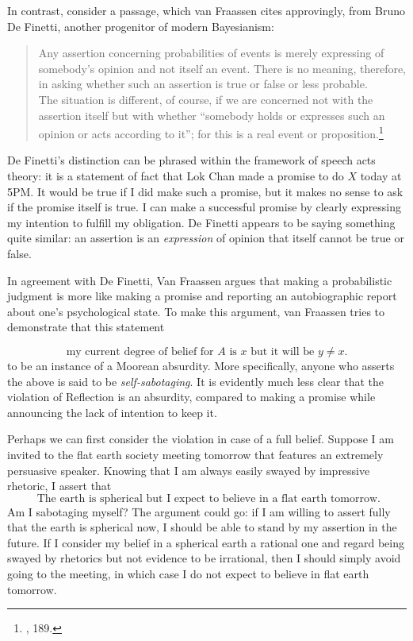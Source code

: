 In contrast, consider a passage, which van Fraassen cites approvingly,
from Bruno De Finetti, another progenitor of modern Bayesianism:

\begin{quote}
Any assertion concerning probabilities of events is merely expressing of
somebody's opinion and not itself an event. There is no meaning,
therefore, in asking whether such an assertion is true or false or less
probable.\\
The situation is different, of course, if we are concerned not with the
assertion itself but with whether ``somebody holds or expresses such an
opinion or acts according to it''; for this is a real event or
proposition.\footnote{\cite{definepis}, 189.}
\end{quote}

De Finetti's distinction can be phrased within the framework of speech
acts theory: it is a statement of fact that Lok Chan made a promise to
do \(X\) today at 5PM. It would be true if I did make such a promise,
but it makes no sense to ask if the promise itself is true. I can make a
successful promise by clearly expressing my intention to fulfill my
obligation. De Finetti appears to be saying something quite similar: an
assertion is an \emph{expression} of opinion that itself cannot be true
or false.

In agreement with De Finetti, Van Fraassen argues that making a
probabilistic judgment is more like making a promise and reporting an
autobiographic report about one's psychological state. To make this
argument, van Fraassen tries to demonstrate that this statement

\begin{equation}
		\text{my current degree of belief for \(A\) is \(x\) but it will be $y\neq x$.}
	\label{eq:reflviolation}
\end{equation}
to be an instance of a Moorean absurdity. More specifically, anyone who
asserts the above is said to be \emph{self-sabotaging}. It is evidently
much less clear that the violation of Reflection is an absurdity,
compared to making a promise while announcing the lack of intention to
keep it. 

Perhaps we can first consider the violation in case
of a full belief. Suppose I am invited to the flat earth society meeting
tomorrow that features an extremely persuasive speaker. Knowing that I am always easily swayed by impressive rhetoric, I assert that
\begin{equation}
	\text{ The earth is spherical but I expect to believe in a flat earth
  tomorrow.}
  \label{eq:flatearth}
\end{equation}
Am I sabotaging myself? The argument could go:  if I am willing to assert
fully that the earth is spherical now, I should be able to stand by my
assertion in the future. If I consider my belief in a spherical
earth a rational one and regard being swayed by rhetorics but not evidence to be irrational, then I should simply avoid going to the meeting, in which case I do not expect to believe in flat earth tomorrow.

